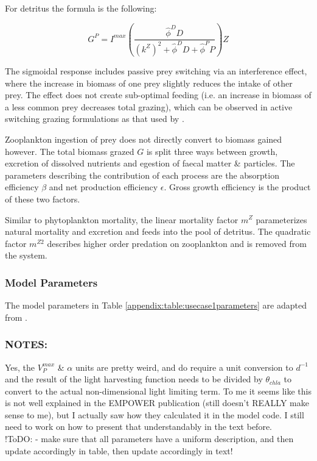 \documentclass[template.tex]{subfiles}
\begin{document}
For detritus the formula is the following:

\begin{equation}
    G^P = I^{max} \left( \frac{ \hat{\phi}^D D}{(k^Z)^2 + \hat{\phi}^D D +\hat{\phi}^P P}  \right) Z
\end{equation}

The sigmoidal response includes passive prey switching via an interference effect, where the increase in biomass of one prey slightly reduces the intake of other prey. The effect does not create sub-optimal feeding (i.e. an increase in biomass of a less common prey decreases total grazing), which can be observed in active switching grazing formulations as that used by \citet{Fasham1990a}.

Zooplankton ingestion of prey does not directly convert to biomass gained however. The total biomass grazed $G$ is split three ways between growth, excretion of dissolved nutrients and egestion of faecal matter \& particles. The parameters describing the contribution of each process are the absorption efficiency $\beta$ and net production efficiency $\epsilon$. Gross growth efficiency is the product of these two factors.  

Similar to phytoplankton mortality, the linear mortality factor $m^Z$ parameterizes natural mortality and excretion and feeds into the pool of detritus. The quadratic factor $m^{Z2}$ describes higher order predation on zooplankton and is removed from the system.



\subsubsection{Model Parameters}
The model parameters in Table \ref{appendix:table:usecase1parameters} are adapted from \citet{Anderson2015c}.


\subsubsection{NOTES:}
Yes, the $V^{max}_P$ \& $\alpha$  units are pretty weird, and do require a unit conversion to $d^{-1}$ and the result of the light harvesting function needs to be divided by $\theta_{chla}$ to convert to the actual non-dimensional light limiting term. To me it seems like this is not well explained in the EMPOWER publication (still doesn't REALLY make sense to me), but I actually saw how they calculated it in the model code. I still need to work on how to present that understandably in the text before. 
\\ !ToDO: 
- make sure that all parameters have a uniform description, and then update accordingly in table, then update accordingly in text! \\
\end{document}
